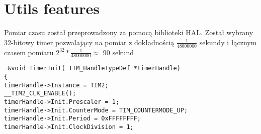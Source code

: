 \documentclass[printmode]{mgr}
\begin{document}
\chapter{Utils features}
Pomiar czasu został przeprowadzony za pomocą biblioteki HAL. Został wybrany 32-bitowy timer pozwalający na pomiar z dokładnością $\frac{1}{48000000}$ sekundy i łącznym czasem pomiaru $2^{32} * \frac{1}{48000000} \approx$ 90 sekund

\texttt{
&void TimerInit( TIM\_HandleTypeDef *timerHandle)\\
\{\\
timerHandle->Instance = TIM2;\\
\_\_TIM2\_CLK\_ENABLE();\\
timerHandle->Init.Prescaler = 1;\\
timerHandle->Init.CounterMode = TIM\_COUNTERMODE\_UP;\\
    timerHandle->Init.Period = 0xFFFFFFFF;\\
    timerHandle->Init.ClockDivision = 1;\\
}
\end{document}
